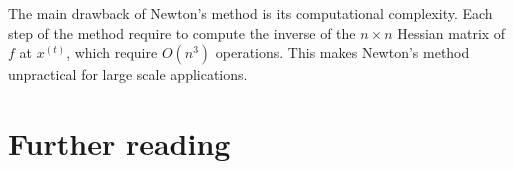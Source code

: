 \documentclass[11pt,nocut]{article}
\begin{document}
The main drawback of Newton's method is its computational complexity. Each step of the method require to compute the inverse of the $n \times n$ Hessian matrix of $f$ at $x^{(t)}$, which require $O(n^3)$ operations. This makes Newton's method unpractical for large scale applications.


\section*{Further reading}


\vspace{1cm}
\centerline{}




\end{document}
